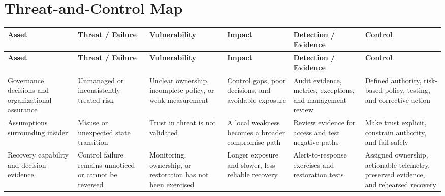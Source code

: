 \documentclass[11pt]{article}
\begin{document}
\section*{Threat-and-Control Map}
\begingroup\scriptsize\setlength{\tabcolsep}{2pt}
\begin{longtable}{>{\RaggedRight\arraybackslash}p{}>{\RaggedRight\arraybackslash}p{}>{\RaggedRight\arraybackslash}p{}>{\RaggedRight\arraybackslash}p{}>{\RaggedRight\arraybackslash}p{}>{\RaggedRight\arraybackslash}p{}}
\toprule\rowcolor{Navy}\color{white}\textbf{Asset} & \color{white}\textbf{Threat / Failure} & \color{white}\textbf{Vulnerability} & \color{white}\textbf{Impact} & \color{white}\textbf{Detection / Evidence} & \color{white}\textbf{Control}\\\midrule
\endfirsthead
\toprule\rowcolor{Navy}\color{white}\textbf{Asset} & \color{white}\textbf{Threat / Failure} & \color{white}\textbf{Vulnerability} & \color{white}\textbf{Impact} & \color{white}\textbf{Detection / Evidence} & \color{white}\textbf{Control}\\\midrule
\endhead
Governance decisions and organizational assurance & Unmanaged or inconsistently treated risk & Unclear ownership, incomplete policy, or weak measurement & Control gaps, poor decisions, and avoidable exposure & Audit evidence, metrics, exceptions, and management review & Defined authority, risk-based policy, testing, and corrective action\\\midrule
Assumptions surrounding insider & Misuse or unexpected state transition & Trust in threat is not validated & A local weakness becomes a broader compromise path & Review evidence for access and test negative paths & Make trust explicit, constrain authority, and fail safely\\\midrule
Recovery capability and decision evidence & Control failure remains unnoticed or cannot be reversed & Monitoring, ownership, or restoration has not been exercised & Longer exposure and slower, less reliable recovery & Alert-to-response exercises and restoration tests & Assigned ownership, actionable telemetry, preserved evidence, and rehearsed recovery\\\midrule
\bottomrule
\end{longtable}
\endgroup
\end{document}
